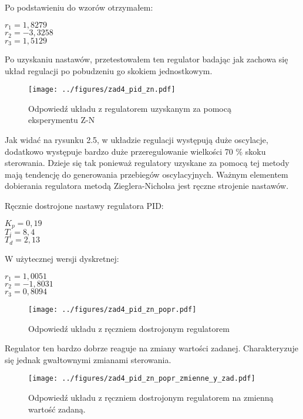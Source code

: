 \documentclass[a4paper,titlepage,11pt,floatssmall]{mwrep}
\begin{document}
Po podstawieniu do wzorów otrzymałem:
\begin{center}
	$r_1 = 1,8279$ \\
	
	$r_2 = -3,3258$ \\

	$r_3 = 1,5129$ \\
\end{center}

Po uzyskaniu nastawów, przetestowałem ten regulator badając jak zachowa się układ regulacji po pobudzeniu go skokiem jednostkowym.

\begin{figure}[H]
\centering
\texttt{[image: ../figures/zad4\_pid\_zn.pdf]}
\caption{Odpowiedź układu z regulatorem uzyskanym za pomocą eksperymentu Z-N}
\end{figure}

\bigskip

Jak widać na rysunku 2.5, w układzie regulacji występują duże oscylacje, dodatkowo występuje bardzo duże przeregulowanie wielkości 70 \% skoku sterowania. Dzieje się tak ponieważ regulatory uzyskane za pomocą tej metody mają tendencję do generowania przebiegów oscylacyjnych. Ważnym elementem dobierania regulatora metodą Zieglera-Nicholsa jest ręczne strojenie nastawów.

Ręcznie dostrojone nastawy regulatora PID:

\begin{center}
	$K_p = 0,19$ \\
	$T_i = 8,4$ \\
	$T_d = 2,13$ \\
\end{center}

W użytecznej wersji dyskretnej:

\begin{center}
	$r_1 = 1,0051$ \\  
	$r_2 = -1,8031$ \\ 
	$r_3 = 0,8094$ \\
\end{center}

\begin{figure}[H]
\centering
\texttt{[image: ../figures/zad4\_pid\_zn\_popr.pdf]}
\caption{Odpowiedź układu z ręczniem dostrojonym regulatorem}
\end{figure}
\newpage 
Regulator ten bardzo dobrze reaguje na zmiany wartości zadanej. Charakteryzuje się jednak gwałtownymi zmianami sterowania.
\begin{figure}[H]
\centering
\texttt{[image: ../figures/zad4\_pid\_zn\_popr\_zmienne\_y\_zad.pdf]}
\caption{Odpowiedź układu z ręczniem dostrojonym regulatorem na zmienną wartość zadaną.}
\end{figure}
\end{document}
